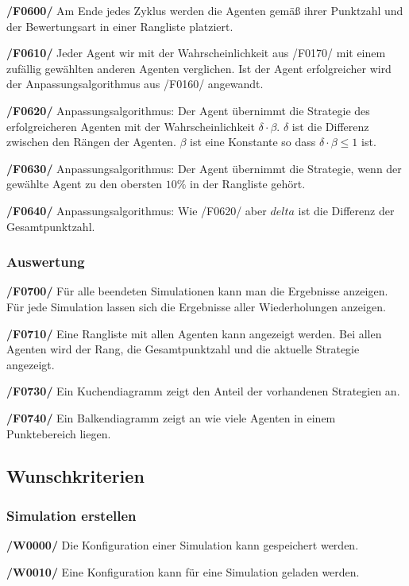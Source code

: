 \textbf{/F0600/}
Am Ende jedes Zyklus werden die Agenten gemäß ihrer Punktzahl und der Bewertungsart in einer Rangliste platziert.

\textbf{/F0610/}
Jeder Agent wir mit der Wahrscheinlichkeit aus /F0170/ mit einem zufällig gewählten anderen Agenten verglichen. Ist der Agent erfolgreicher wird der Anpassungsalgorithmus aus /F0160/ angewandt.

\textbf{/F0620/}
Anpassungsalgorithmus: Der Agent übernimmt die Strategie des erfolgreicheren Agenten mit der Wahrscheinlichkeit $\delta \cdot \beta$. $\delta$ ist die Differenz zwischen den Rängen der Agenten. $\beta$ ist eine Konstante so dass $\delta \cdot \beta \leq 1$ ist.

\textbf{/F0630/}
Anpassungsalgorithmus: Der Agent übernimmt die Strategie, wenn der gewählte Agent zu den obersten $10\%$ in der Rangliste gehört.

\textbf{/F0640/}
Anpassungsalgorithmus: Wie /F0620/ aber $delta$ ist die Differenz der Gesamtpunktzahl.

\subsubsection{Auswertung}

\textbf{/F0700/}
Für alle beendeten Simulationen kann man die Ergebnisse anzeigen. Für jede Simulation lassen sich die Ergebnisse aller Wiederholungen anzeigen.

\textbf{/F0710/}
Eine Rangliste mit allen Agenten kann angezeigt werden. Bei allen Agenten wird der Rang, die Gesamtpunktzahl und die aktuelle Strategie angezeigt.

\textbf{/F0730/}
Ein Kuchendiagramm zeigt den Anteil der vorhandenen Strategien an.

\textbf{/F0740/}
Ein Balkendiagramm zeigt an wie viele Agenten in einem Punktebereich liegen. 

\subsection{Wunschkriterien}

\subsubsection{Simulation erstellen}

\textbf{/W0000/}
Die Konfiguration einer Simulation kann gespeichert werden.

\textbf{/W0010/}
Eine Konfiguration kann für eine Simulation geladen werden.

